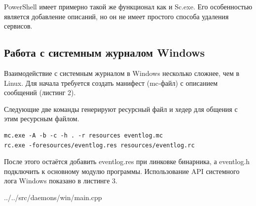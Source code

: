 PowerShell имеет примерно такой же функционал как и Sc.exe. Его особенностью является добавление описаний, но он не имеет простого способа удаления сервисов.

\subsection{Работа с системным журналом Windows}

Взаимодействие с системным журналом в Windows несколько сложнее, чем в Linux. Для начала требуется создать манифест (mc-файл) с описанием сообщений (листинг 2)\cite{Cit7}.



Следующие две команды генерируют ресурсный файл и хедер для общения с этим ресурсным файлом.

\begin{Verbatim}[frame=single]
mc.exe -A -b -c -h . -r resources eventlog.mc
rc.exe -foresources/eventlog.res resources/eventlog.rc
\end{Verbatim}

После этого остаётся добавить eventlog.res при линковке бинарника, а eventlog.h подключить к основному модулю программы. Использование API системного лога Windows показано в листинге 3.


{../../src/daemons/win/main.cpp}